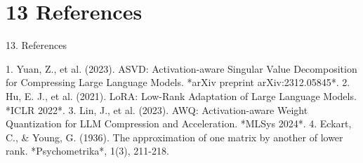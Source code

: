 \section{13 References}

 13. References

1. Yuan, Z., et al. (2023). ASVD: Activation-aware Singular Value Decomposition for Compressing Large Language Models. *arXiv preprint arXiv:2312.05845*.
2. Hu, E. J., et al. (2021). LoRA: Low-Rank Adaptation of Large Language Models. *ICLR 2022*.
3. Lin, J., et al. (2023). AWQ: Activation-aware Weight Quantization for LLM Compression and Acceleration. *MLSys 2024*.
4. Eckart, C., \& Young, G. (1936). The approximation of one matrix by another of lower rank. *Psychometrika*, 1(3), 211-218.
